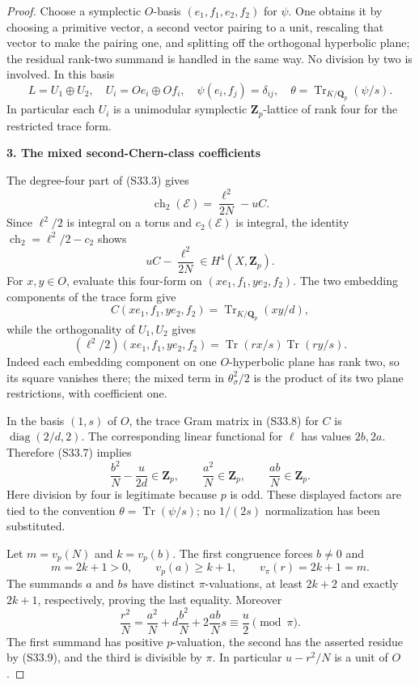 \documentclass[11pt,a4paper]{article}
\theoremstyle{definition}
\begin{document}
\begin{proof}
Choose a symplectic \(O\)-basis \((e_1,f_1,e_2,f_2)\) for \(\psi\). One obtains it by choosing a primitive vector, a second vector pairing to a unit, rescaling that vector to make the pairing one, and splitting off the orthogonal hyperbolic plane; the residual rank-two summand is handled in the same way. No division by two is involved. In this basis \[
 L=U_1\oplus U_2,
 \quad U_i=Oe_i\oplus Of_i,
 \quad \psi(e_i,f_j)=\delta_{ij},
 \quad \theta=\operatorname{Tr}_{K/\mathbf Q_p}(\psi/s).
 \tag{S33.6}
\] In particular each \(U_i\) is a unimodular symplectic \(\mathbf Z_p\)-lattice of rank four for the restricted trace form.

\par\medskip\noindent\textbf{3. The mixed second-Chern-class coefficients}\quad 

The degree-four part of (S33.3) gives \[
 \operatorname{ch}_2(\mathcal E)=\frac{\ell^2}{2N}-uC.
\] Since \(\ell^2/2\) is integral on a torus and \(c_2(\mathcal E)\) is integral, the identity \(\operatorname{ch}_2=\ell^2/2-c_2\) shows \[
 uC-\frac{\ell^2}{2N}\in H^4(X,\mathbf Z_p).
 \tag{S33.7}
\] For \(x,y\in O\), evaluate this four-form on \((xe_1,f_1,ye_2,f_2)\). The two embedding components of the trace form give \[
 C(xe_1,f_1,ye_2,f_2)=\operatorname{Tr}_{K/\mathbf Q_p}(xy/d),
\] while the orthogonality of \(U_1,U_2\) gives \[
 (\ell^2/2)(xe_1,f_1,ye_2,f_2)
 =\operatorname{Tr}(rx/s)\operatorname{Tr}(ry/s).
 \tag{S33.8}
\] Indeed each embedding component on one \(O\)-hyperbolic plane has rank two, so its square vanishes there; the mixed term in \(\theta_\sigma^2/2\) is the product of its two plane restrictions, with coefficient one.

In the basis \((1,s)\) of \(O\), the trace Gram matrix in (S33.8) for \(C\) is \(\operatorname{diag}(2/d,2)\). The corresponding linear functional for \(\ell\) has values \(2b,2a\). Therefore (S33.7) implies \[
 \frac{b^2}{N}-\frac{u}{2d}\in\mathbf Z_p,
 \qquad \frac{a^2}{N}\in\mathbf Z_p,
 \qquad \frac{ab}{N}\in\mathbf Z_p.
 \tag{S33.9}
\] Here division by four is legitimate because \(p\) is odd. These displayed factors are tied to the convention \(\theta=\operatorname{Tr}(\psi/s)\); no \(1/(2s)\) normalization has been substituted.

Let \(m=v_p(N)\) and \(k=v_p(b)\). The first congruence forces \(b\ne0\) and \[
 m=2k+1>0,
 \qquad v_p(a)\ge k+1,
 \qquad v_\pi(r)=2k+1=m.
 \tag{S33.10}
\] The summands \(a\) and \(bs\) have distinct \(\pi\)-valuations, at least \(2k+2\) and exactly \(2k+1\), respectively, proving the last equality. Moreover \[
 \frac{r^2}{N}
 =\frac{a^2}{N}+d\frac{b^2}{N}
             +2\frac{ab}{N}s
 \equiv\frac u2\pmod\pi.
 \tag{S33.11}
\] The first summand has positive \(p\)-valuation, the second has the asserted residue by (S33.9), and the third is divisible by \(\pi\). In particular \(u-r^2/N\) is a unit of \(O\).


\end{proof}
\end{document}
